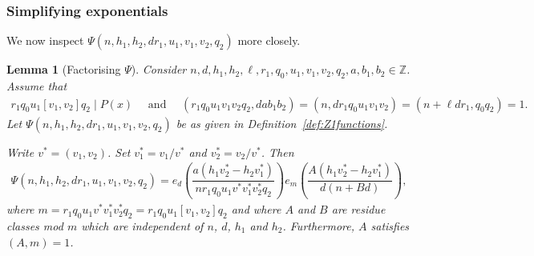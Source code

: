 \documentclass{amsart}
\newtheorem{lemma}{Lemma}
\numberwithin{equation}{section}
\begin{document}
\subsubsection{Simplifying exponentials} We now inspect $\Psi(n,h_1,h_2,dr_1,u_1,v_1,v_2,q_2)$ more closely. 

\begin{lemma}[Factorising $\Psi$] \label{lem:simplifyingexponentialsII}
Consider $n, d, h_1,h_2,\ell,r_1, q_0, u_1,v_1,v_2,q_2,a,b_1,b_2 \in \mathbb{Z}$. Assume that 
\begin{align*}
r_1q_0u_1[v_1,v_2]q_2 \mid P(x) \quad \mbox{ and } \quad (r_1q_0u_1v_1v_2q_2,dab_1b_2)= (n,dr_1q_0u_1v_1v_2)=(n+\ell d r_1,q_0q_2)=1.
\end{align*} Let $\Psi(n,h_1,h_2,dr_1,u_1,v_1,v_2,q_2)$ be as given in Definition~{\rm\ref{def:Z1functions}}.   

\vspace{3mm}
Write $v^*=(v_1,v_2)$. Set $v_1^* = v_1/v^*$ and $v_2^* = v_2/ v^* $.  Then
\begin{align*}
\Psi(n,h_1,h_2,dr_1,u_1,v_1,v_2,q_2)=e_{d}\left(\dfrac{a(h_1v_2^*-h_2v_1^*)}{nr_1q_0u_1v^*v_1^*v_2^*q_2}\right) e_{m}\left(\dfrac{A (h_1v_2^*-h_2v_1^*) }{d(n+B d)}\right), 
\end{align*}
 where  $m= r_1q_0 u_1 v^*v_1^*v_2^*q_2= r_1q_0 u_1 [v_1,v_2]q_2$   and where $A$ and $B$ are residue classes mod $m$ which are  independent of $n$, $d$, $h_1$ and $h_2$. Furthermore, $A$ satisfies $(A,m)=1$. 
\end{lemma}
\end{document}
